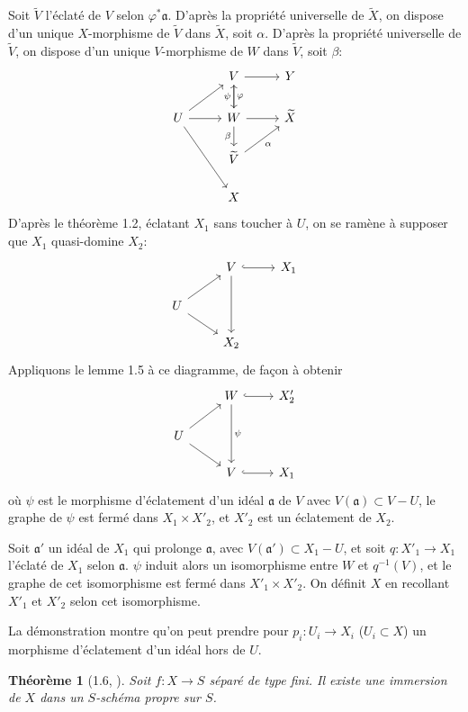\documentclass[10pt,a4paper]{article}
\theoremstyle{deligne}
\newtheorem*{theorem*}{Théorème}
\newcommand{\heading}[1]{\vspace{0.65em}\noindent{\bfseries #1}\quad}
\begin{document}
Soit \(\widetilde V\) l'éclaté de \(V\) selon \(\varphi^*\mathfrak a\). D'après la propriété universelle de \(\widetilde X\), on dispose d'un unique \(X\)-morphisme de \(\widetilde V\) dans \(\widetilde X\), soit \(\alpha\). D'après la propriété universelle de \(\widetilde V\), on dispose d'un unique \(V\)-morphisme de \(W\) dans \(\widetilde V\), soit \(\beta\):
\[
\begin{tikzcd}[column sep=2.6em,row sep=1.6em]
& V \arrow[r] \arrow[d,"\varphi"] & Y\\
U \arrow[ur] \arrow[r] \arrow[ddr] & W \arrow[r] \arrow[u,"\psi"] \arrow[d,"\beta"'] & \widetilde X\\
& \widetilde V \arrow[ur,"\alpha"']\\
& X
\end{tikzcd}
\]
D'après le théorème 1.2, éclatant \(X_1\) sans toucher à \(U\), on se ramène à supposer que \(X_1\) quasi-domine \(X_2\):
\[
\begin{tikzcd}[column sep=2.4em,row sep=1.5em]
& V \arrow[r,hook] \arrow[dd] & X_1 \\
U \arrow[ur] \arrow[dr] & {\phantom{X}} & {\phantom{X}} \\
& X_2
\end{tikzcd}
\]
Appliquons le lemme 1.5 à ce diagramme, de façon à obtenir
\[
\begin{tikzcd}[column sep=2.4em,row sep=1.5em]
& W \arrow[r,hook] \arrow[dd,"\psi"] & X'_2 \\
U \arrow[ur] \arrow[dr] & {\phantom{X}} & {\phantom{X}} \\
& V \arrow[r,hook] & X_1
\end{tikzcd}
\]
où \(\psi\) est le morphisme d'éclatement d'un idéal \(\mathfrak a\) de \(V\) avec \(V(\mathfrak a)\subset V-U\), le graphe de \(\psi\) est fermé dans \(X_1\times X'_2\), et \(X'_2\) est un éclatement de \(X_2\).

Soit \(\mathfrak a'\) un idéal de \(X_1\) qui prolonge \(\mathfrak a\), avec \(V(\mathfrak a')\subset X_1-U\), et soit \(q:X'_1\to X_1\) l'éclaté de \(X_1\) selon \(\mathfrak a\). \(\psi\) induit alors un isomorphisme entre \(W\) et \(q^{-1}(V)\), et le graphe de cet isomorphisme est fermé dans \(X'_1\times X'_2\). On définit \(X\) en recollant \(X'_1\) et \(X'_2\) selon cet isomorphisme.

\heading{Remarque.}
La démonstration montre qu'on peut prendre pour \(p_i:U_i\to X_i\) (\(U_i\subset X\)) un morphisme d'éclatement d'un idéal hors de \(U\).

\begin{theorem*}[1.6, {}]
Soit \(f:X\to S\) séparé de type fini. Il existe une immersion de \(X\) dans un \(S\)-schéma propre sur \(S\).
\end{theorem*}
\end{document}
